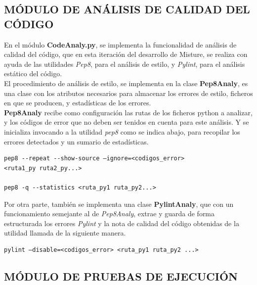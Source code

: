 \subsection{MÓDULO DE ANÁLISIS DE CALIDAD DEL CÓDIGO}

En el módulo \textbf{CodeAnaly.py}, se implementa la funcionalidad de análisis de calidad del código, que en esta iteración del desarrollo de Misture, se realiza con ayuda de las utilidades \textit{Pep8}, para el análisis de estilo, y \textit{Pylint}, para el análisis estático del código.\\


El procedimiento de análisis de estilo, se implementa en la clase \textbf{Pep8Analy}, es una clase con los atributos necesarios para almacenar los errores de estilo, ficheros en que se producen, y estadísticas de los errores.\\


\textbf{Pep8Analy}  recibe como configuración las rutas de los ficheros python a analizar, y los códigos de error que no deben ser tenidos en cuenta para este análisis. Y se inicializa invocando a la utilidad \textit{pep8} como se indica abajo, para recopilar los errores detectados y un sumario de estadísticas.\\

\begin{verbatim}
pep8 --repeat --show-source –ignore=<codigos_error>
<ruta1_py ruta2_py...>

pep8 -q --statistics <ruta_py1 ruta_py2...>
\end{verbatim}


Por otra parte, también se implementa una clase \textbf{PylintAnaly}, que con un funcionamiento semejante al de \textit{Pep8Analy}, extrae y guarda de forma estructurada los errores \textit{Pylint} y la nota de calidad del código obtenidas de la utilidad llamada de la siguiente manera.\\

\begin{verbatim}
pylint –disable=<codigos_error> <ruta_py1 ruta_py2 ...>
\end{verbatim}


\subsection{MÓDULO DE PRUEBAS DE EJECUCIÓN}

